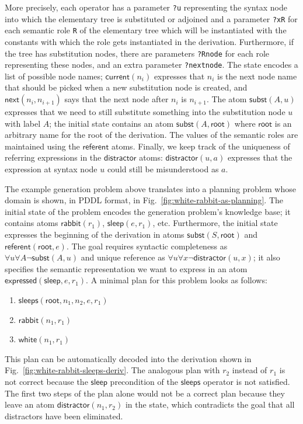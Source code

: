 More precisely, each operator has a parameter \verb|?u| representing
the syntax node into which the elementary tree is substituted or
adjoined and a parameter \verb|?xR| for each semantic role \verb|R| of
the elementary tree which will be instantiated with the constants with
which the role gets instantiated in the derivation. Furthermore, if
the tree has substitution nodes, there are parameters \verb|?Rnode|
for each role representing these nodes, and an extra parameter
\verb|?nextnode|. The state encodes a list of possible node names;
$\mathsf{current}(n_i)$ expresses that $n_i$ is the next node name
that should be picked when a new substitution node is created, and
$\mathsf{next}(n_i,n_{i+1})$ says that the next node after $n_i$ is
$n_{i+1}$. The atom $\mathsf{subst}(A,u)$ expresses that we need to
still substitute something into the substitution node $u$ with label
$A$; the initial state contains an atom
$\mathsf{subst}(A,\mathsf{root})$ where $\mathsf{root}$ is an
arbitrary name for the root of the derivation.  The values of the
semantic roles are maintained using the $\mathsf{referent}$ atoms.
Finally, we keep track of the uniqueness of referring expressions in
the $\mathsf{distractor}$ atoms: $\mathsf{distractor}(u,a)$ expresses
that the expression at syntax node $u$ could still be misunderstood as
$a$.

The example generation problem above translates into a planning
problem whose domain is shown, in PDDL format, in
Fig.~\ref{fig:white-rabbit-as-planning}. The initial state of the
problem encodes the generation problem's knowledge base; it contains
atoms $\mathsf{rabbit}(r_1)$, $\mathsf{sleep}(e,r_1)$, etc.
Furthermore, the initial state expresses the beginning of the
derivation in atoms $\mathsf{subst}(S,\mathsf{root})$ and
$\mathsf{referent}(\mathsf{root},e)$.  The goal requires syntactic
completeness as $\forall u \forall A \neg \mathsf{subst}(A,u)$ and
unique reference as $\forall u \forall x \neg
\mathsf{distractor}(u,x)$; it also specifies the semantic
representation we want to express in an atom
$\mathsf{expressed}(\mathsf{sleep},e,r_1)$.  A minimal plan for this
problem looks as follows:

\begin{enumerate}
\item $\mathsf{sleeps}(\mathsf{root}, n_1, n_2, e, r_1)$
\item $\mathsf{rabbit}(n_1, r_1)$
\item $\mathsf{white}(n_1, r_1)$
\end{enumerate}

This plan can be automatically decoded into the derivation shown in
Fig.~\ref{fig:white-rabbit-sleeps-deriv}.  The analogous plan with
$r_2$ instead of $r_1$ is not correct because the $\mathsf{sleep}$
precondition of the $\mathsf{sleeps}$ operator is not satisfied.  The
first two steps of the plan alone would not be a correct plan because
they leave an atom $\mathsf{distractor}(n_1, r_2)$ in the state, which
contradicts the goal that all distractors have been eliminated.






